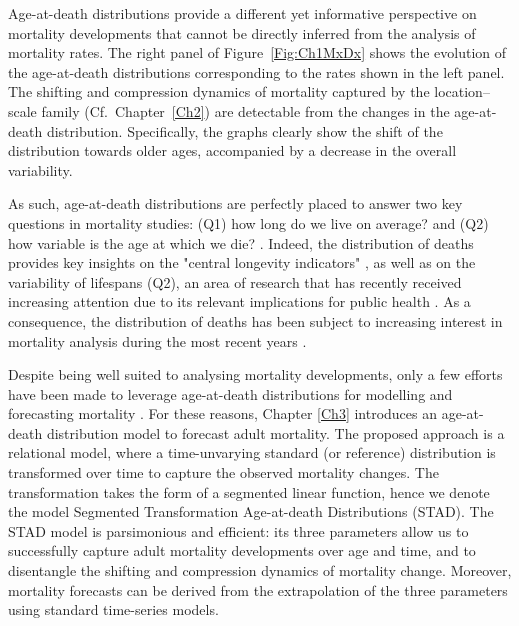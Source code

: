 \documentclass[Thesis]{subfiles}
\begin{document}
Age-at-death distributions provide a different yet informative perspective on mortality developments that cannot be directly inferred from the analysis of mortality rates. The right panel of Figure~\ref{Fig:Ch1MxDx} shows the evolution of the age-at-death distributions corresponding to the rates shown in the left panel. The shifting and compression dynamics of mortality captured by the location--scale family (Cf.~Chapter~\ref{Ch2}) are detectable from the changes in the age-at-death distribution. Specifically, the graphs clearly show the shift of the distribution towards older ages, accompanied by a decrease in the overall variability. 

As such, age-at-death distributions are perfectly placed to answer two key questions in mortality studies: (Q1) how long do we live on average? and (Q2) how variable is the age at which we die? \citep{ouellette2011changes}. Indeed, the distribution of deaths provides key insights on the "central longevity indicators" \cite[mean, median and modal age at death,][Q1]{cheung2005three,canudas2010three}, as well as on the variability of lifespans (Q2), an area of research that has recently received increasing attention due to its relevant implications for public health \citep{vanraalte2018case}. As a consequence, the distribution of deaths has been subject to increasing interest in mortality analysis during the most recent years \cite[see, e.g.,][]{ouellette2011changes,mazzuco2018mortality,keilman2019mortality}. 

Despite being well suited to analysing mortality developments, only a few efforts have been made to leverage age-at-death distributions for modelling and forecasting mortality \cite[see, e.g.,][]{oeppen2008coherent,oeppen2013coherent,bergeron2017coherent,pascariu2019maximum}. For these reasons, Chapter \ref{Ch3} introduces an age-at-death distribution model to forecast adult mortality. The proposed approach is a relational model, where a time-unvarying standard (or reference) distribution is transformed over time to capture the observed mortality changes. The transformation takes the form of a segmented linear function, hence we denote the model Segmented Transformation Age-at-death Distributions (STAD). The STAD model is parsimonious and efficient: its three parameters allow us to successfully capture adult mortality developments over age and time, and to disentangle the shifting and compression dynamics of mortality change. Moreover, mortality forecasts can be derived from the extrapolation of the three parameters using standard time-series models.
\end{document}

